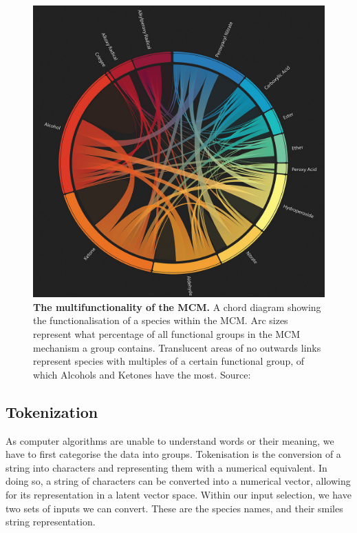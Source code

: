 \begin{figure}[H]
    \centering
    \includegraphics[width=\textwidth]{4fig/coverfig.jpg}
    \caption{\textbf{The multifunctionality of the MCM.} A chord diagram showing the functionalisation of a species within the MCM. Arc sizes represent what percentage of all functional groups in the MCM mechanism a group contains. Translucent areas of no outwards links represent species with multiples of a certain functional group, of which Alcohols and Ketones have the most.  
    Source: \citep{cover} }
    \label{fig:covermcm}
\end{figure}



\subsection{Tokenization}
As computer algorithms are unable to understand words or their meaning, we have to first categorise the data into groups. Tokenisation is the conversion of a string into characters and representing them with a numerical equivalent. In doing so, a string of characters can be converted into a numerical vector, allowing for its representation in a latent vector space. 
Within our input selection, we have two sets of inputs we can convert. These are the species names, and their smiles string representation. 



